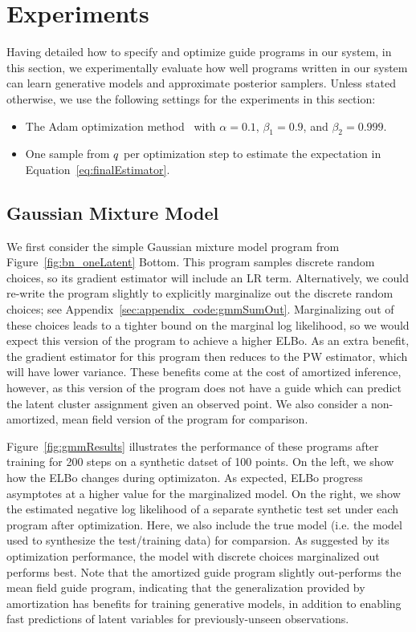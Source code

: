 \section{Experiments}
\label{sec:results}

Having detailed how to specify and optimize guide programs in our system, in this section, we experimentally evaluate how well programs written in our system can learn generative models and approximate posterior samplers. Unless stated otherwise, we use the following settings for the experiments in this section:
\begin{itemize}
\item{The Adam optimization method~\cite{Adam} with $\alpha = 0.1$, $\beta_1 = 0.9$, and $\beta_2 = 0.999$.}
\item{One sample from $q$ per optimization step to estimate the expectation in Equation~\ref{eq:finalEstimator}.}
\end{itemize}

\subsection{Gaussian Mixture Model}
\label{sec:results_gmm}

We first consider the simple Gaussian mixture model program from Figure~\ref{fig:bn_oneLatent} Bottom. This program samples discrete random choices, so its gradient estimator will include an LR term. Alternatively, we could re-write the program slightly to explicitly marginalize out the discrete random choices; see Appendix~\ref{sec:appendix_code:gmmSumOut}.
Marginalizing out of these choices leads to a tighter bound on the marginal log likelihood, so we would expect this version of the program to achieve a higher ELBo.
As an extra benefit, the gradient estimator for this program then reduces to the PW estimator, which will have lower variance. These benefits come at the cost of amortized inference, however, as this version of the program does not have a guide which can predict the latent cluster assignment given an observed point. We also consider a non-amortized, mean field version of the program for comparison.

Figure~\ref{fig:gmmResults} illustrates the performance of these programs after training for 200 steps on a synthetic datset of 100 points. On the left, we show how the ELBo changes during optimizaton.
As expected, ELBo progress asymptotes at a higher value for the marginalized model.
On the right, we show the estimated negative log likelihood of a separate synthetic test set under each program after optimization. Here, we also include the true model (i.e. the model used to synthesize the test/training data) for comparsion.
As suggested by its optimization performance, the model with discrete choices marginalized out performs best.
Note that the amortized guide program slightly out-performs the mean field guide program, indicating that the generalization provided by amortization has benefits for training generative models, in addition to enabling fast predictions of latent variables for previously-unseen observations.

